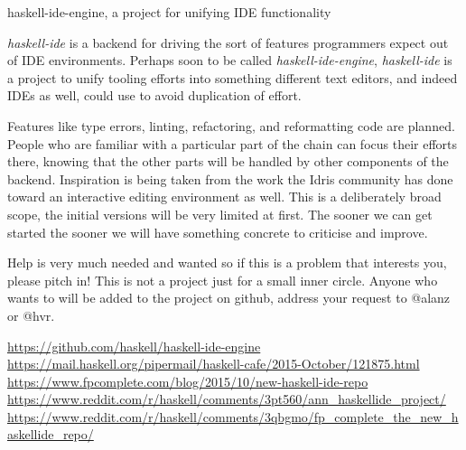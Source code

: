 \documentclass[DIV16,twocolumn,10pt]{scrreprt}
\begin{document}
\begin{hcarentry}{haskell-ide-engine, a project for unifying IDE functionality}

\makeheader

\textit{haskell-ide} is a backend for driving the sort of features programmers
expect out of IDE environments. Perhaps soon to be called
\textit{haskell-ide-engine}, \textit{haskell-ide} is a project to unify tooling
efforts into something different text editors, and indeed IDEs as well, could
use to avoid duplication of effort.

Features like type errors, linting, refactoring, and reformatting code are
planned. People who are familiar with a particular part of the chain can
focus their efforts there, knowing that the other parts will be handled by
other components of the backend. Inspiration is being taken from the work the
Idris community has done toward an interactive editing environment as well. This
is a deliberately broad scope, the initial versions will be very limited at
first. The sooner we can get started the sooner we will have something concrete
to criticise and improve.

Help is very much needed and wanted so if this is a problem that interests you,
please pitch in! This is not a project just for a small inner circle. Anyone
who wants to will be added to the project on github, address your request to
@alanz or @hvr.

\FurtherReading
  \url{https://github.com/haskell/haskell-ide-engine} \\
  \url{https://mail.haskell.org/pipermail/haskell-cafe/2015-October/121875.html} \\
  \url{https://www.fpcomplete.com/blog/2015/10/new-haskell-ide-repo} \\
  \url{https://www.reddit.com/r/haskell/comments/3pt560/ann_haskellide_project/} \\
  \url{https://www.reddit.com/r/haskell/comments/3qbgmo/fp_complete_the_new_haskellide_repo/}

\end{hcarentry}
\end{document}
